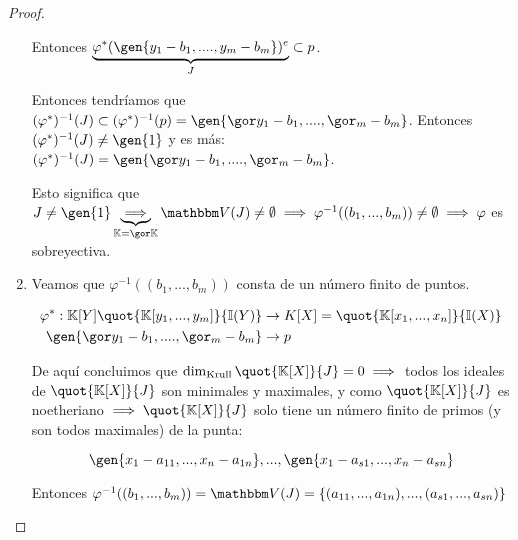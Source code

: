 \begin{proof}
\begin{enumerate}
		Entonces $\underbrace{\varphi^*(\gen{y_1-b_1,....,y_m-b_m})^e}_{J} \subset p$.

		Entonces tendríamos que $(\varphi^*)^{-1}(J) \subset (\varphi^*)^{-1}(p)=\gen{\cls{y_1-b_1},....,\cls{_m-b_m}}$. Entonces $(\varphi^*)^{-1}(J) \neq \gen{1}$ y es más: $(\varphi^*)^{-1}(J) = \gen{\cls{y_1-b_1},....,\cls{_m-b_m}}$.

		Esto significa que $J \neq \gen{1} \underbrace{\implies}_{\K = \cls{\K}} \V(J) \neq \emptyset \implies \varphi^{-1}((b_1,...,b_m)) \neq \emptyset \implies \varphi$ es sobreyectiva.

		\item Veamos que $\varphi^{-1}((b_1,...,b_m))$ consta de un número finito de puntos.

		\begin{align*}
			\varphi^*: \K[Y]  \quot{\K[y_1,...,y_m]}{\I(Y)}& \rightarrow K[X] = \quot{\K[x_1,...,x_n]}{\I(X)} \\
			\gen{\cls{y_1-b_1},....,\cls{_m-b_m}} & \rightarrow p
		\end{align*}


		De aquí concluimos que $\dk \quot{\K[X]}{J}=0 \implies$ todos los ideales de $\quot{\K[X]}{J}$ son minimales y maximales, y como $\quot{\K[X]}{J}$ es noetheriano $\implies \quot{\K[X]}{J}$ solo tiene un número finito de primos (y son todos maximales) de la punta:

		$$ \gen{x_1-a_{11},...,x_n-a_{1n}},...,\gen{x_1-a_{s1},...,x_n-a_{sn}} $$

		Entonces $\varphi^{-1}((b_1,...,b_m))= \V(J)=\{ (a_{11},...,a_{1n}),...,(a_{s1},...,a_{sn}) \}$
	\end{enumerate}
\end{proof}

